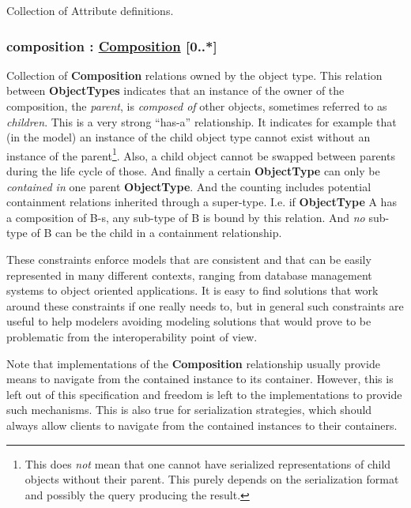 \documentclass[10pt,a4paper]{ivoa}
\begin{document}
Collection of Attribute definitions.

\hypertarget{composition-composition-0..}{%
\subsubsection{\texorpdfstring{composition :
\protect\hyperlink{composition-extends-relation}{Composition}
{[}0..*{]}}{composition : Composition {[}0..*{]}}}\label{composition-composition-0..}}

Collection of \textbf{Composition} relations owned by the object type.
This relation between \textbf{ObjectTypes} indicates that an instance of
the owner of the composition, the \emph{parent}, is \emph{composed of}
other objects, sometimes referred to as \emph{children}. This is a very
strong ``has-a'' relationship. It indicates for example that (in the
model) an instance of the child object type cannot exist without an
instance of the parent\footnote{This does \emph{not} mean that one
  cannot have serialized representations of child objects without their
  parent. This purely depends on the serialization format and possibly
  the query producing the result.}. Also, a child object cannot be
swapped between parents during the life cycle of those. And finally a
certain \textbf{ObjectType} can only be \emph{contained in} one parent
\textbf{ObjectType}. And the counting includes potential containment
relations inherited through a super-type. I.e. if \textbf{ObjectType} A
has a composition of B-s, any sub-type of B is bound by this relation.
And \emph{no} sub-type of B can be the child in a containment
relationship.

These constraints enforce models that are consistent and that can be
easily represented in many different contexts, ranging from database
management systems to object oriented applications. It is easy to find
solutions that work around these constraints if one really needs to, but
in general such constraints are useful to help modelers avoiding
modeling solutions that would prove to be problematic from the
interoperability point of view.

Note that implementations of the \textbf{Composition} relationship
usually provide means to navigate from the contained instance to its
container. However, this is left out of this specification and freedom
is left to the implementations to provide such mechanisms. This is also
true for serialization strategies, which should always allow clients to
navigate from the contained instances to their containers.
\end{document}
